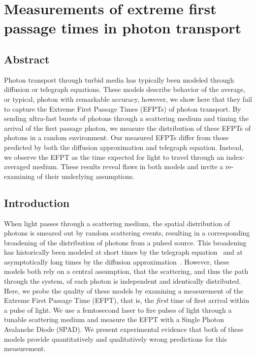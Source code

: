 \chapter{Measurements of extreme first passage times in photon transport}
\label{photons}

\section{Abstract}
Photon transport through turbid media has typically been modeled through diffusion or telegraph equations. These models describe behavior of the average, or typical, photon with remarkable accuracy, however, we show here that they fail to capture the Extreme First Passage Times (EFPTs) of photon transport. By sending ultra-fast bursts of photons through a scattering medium and timing the arrival of the first passage photon, we measure the distribution of these EFPTs of photons in a random environment. Our measured EFPTs differ from those predicted by both the diffusion approximation and telegraph equation. Instead, we observe the EFPT as the time expected for light to travel through an index-averaged medium. These results reveal flaws in both models and invite a re-examining of their underlying assumptions.

\section{Introduction}
When light passes through a scattering medium, the spatial distribution of photons is smeared out by random scattering events, resulting in a corresponding broadening of the distribution of photons from a pulsed source. This broadening has historically been modeled at short times by the telegraph equation~\cite{goldstein_diffusion_1951,ishimaru_diffusion_1989,durian_photon_1997,lemieux_diffusing-light_1998} and at asymptotically long times by the diffusion approximation~\cite{haskell_boundary_1994,bohren_absorption_1983,ishimaru_wave_1997}.  However, these models both rely on a central assumption, that the scattering, and thus the path through the system, of each photon is independent and identically distributed.  Here, we probe the quality of these models by examining a measurement of the Extreme First Passage Time (EFPT), that is, the \textit{first} time of first arrival within a pulse of light.  We use a femtosecond laser to fire pulses of light through a tunable scattering medium and measure the EFPT with a Single Photon Avalanche Diode (SPAD).  We present experimental evidence that both of these models provide quantitatively and qualitatively wrong predictions for this measurement. 


